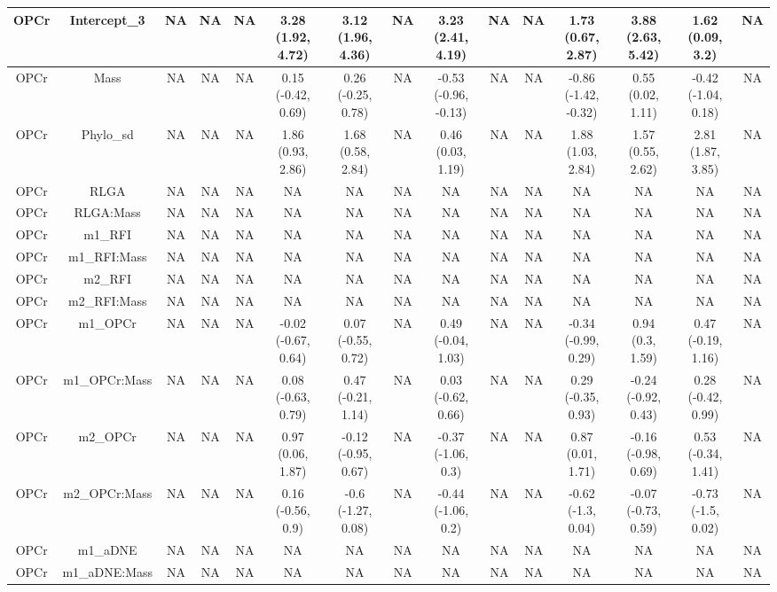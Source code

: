 \begin{longtable}[t]{c|c|c|c|c|c|c|c|c|c|c|c|c|c|c}
\hline
OPCr & Intercept_3 & NA & NA & NA & 3.28 (1.92, 4.72) & 3.12 (1.96, 4.36) & NA & 3.23 (2.41, 4.19) & NA & NA & 1.73 (0.67, 2.87) & 3.88 (2.63, 5.42) & 1.62 (0.09, 3.2) & NA\\
\hline
OPCr & Mass & NA & NA & NA & 0.15 (-0.42, 0.69) & 0.26 (-0.25, 0.78) & NA & -0.53 (-0.96, -0.13) & NA & NA & -0.86 (-1.42, -0.32) & 0.55 (0.02, 1.11) & -0.42 (-1.04, 0.18) & NA\\
\hline
OPCr & Phylo_sd & NA & NA & NA & 1.86 (0.93, 2.86) & 1.68 (0.58, 2.84) & NA & 0.46 (0.03, 1.19) & NA & NA & 1.88 (1.03, 2.84) & 1.57 (0.55, 2.62) & 2.81 (1.87, 3.85) & NA\\
\hline
OPCr & RLGA & NA & NA & NA & NA & NA & NA & NA & NA & NA & NA & NA & NA & NA\\
\hline
OPCr & RLGA:Mass & NA & NA & NA & NA & NA & NA & NA & NA & NA & NA & NA & NA & NA\\
\hline
OPCr & m1_RFI & NA & NA & NA & NA & NA & NA & NA & NA & NA & NA & NA & NA & NA\\
\hline
OPCr & m1_RFI:Mass & NA & NA & NA & NA & NA & NA & NA & NA & NA & NA & NA & NA & NA\\
\hline
OPCr & m2_RFI & NA & NA & NA & NA & NA & NA & NA & NA & NA & NA & NA & NA & NA\\
\hline
OPCr & m2_RFI:Mass & NA & NA & NA & NA & NA & NA & NA & NA & NA & NA & NA & NA & NA\\
\hline
OPCr & m1_OPCr & NA & NA & NA & -0.02 (-0.67, 0.64) & 0.07 (-0.55, 0.72) & NA & 0.49 (-0.04, 1.03) & NA & NA & -0.34 (-0.99, 0.29) & 0.94 (0.3, 1.59) & 0.47 (-0.19, 1.16) & NA\\
\hline
OPCr & m1_OPCr:Mass & NA & NA & NA & 0.08 (-0.63, 0.79) & 0.47 (-0.21, 1.14) & NA & 0.03 (-0.62, 0.66) & NA & NA & 0.29 (-0.35, 0.93) & -0.24 (-0.92, 0.43) & 0.28 (-0.42, 0.99) & NA\\
\hline
OPCr & m2_OPCr & NA & NA & NA & 0.97 (0.06, 1.87) & -0.12 (-0.95, 0.67) & NA & -0.37 (-1.06, 0.3) & NA & NA & 0.87 (0.01, 1.71) & -0.16 (-0.98, 0.69) & 0.53 (-0.34, 1.41) & NA\\
\hline
OPCr & m2_OPCr:Mass & NA & NA & NA & 0.16 (-0.56, 0.9) & -0.6 (-1.27, 0.08) & NA & -0.44 (-1.06, 0.2) & NA & NA & -0.62 (-1.3, 0.04) & -0.07 (-0.73, 0.59) & -0.73 (-1.5, 0.02) & NA\\
\hline
OPCr & m1_aDNE & NA & NA & NA & NA & NA & NA & NA & NA & NA & NA & NA & NA & NA\\
\hline
OPCr & m1_aDNE:Mass & NA & NA & NA & NA & NA & NA & NA & NA & NA & NA & NA & NA & NA\\

\end{longtable}
